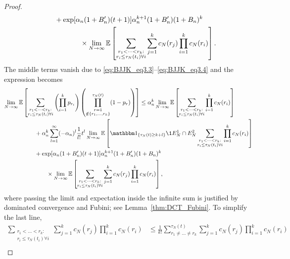 \begin{proof}
\begin{align}
    &\qquad+ \exp[ \alpha_n (1 + B_n^\prime) (t+1) ]
        \alpha_n^{k+1} (1 + B_n^\prime) (1 + B_n)^k \notag\\
    &\hspace{2cm}\times \lim_{N\to\infty} \mathbb{E}\left[ \sum_{\substack{r_1 <\dots< r_k 
        :\\ r_i \leq \tau_N(t_i) \forall i}}
        \sum_{j=1}^k c_N(r_j)
        \prod_{i=1}^k c_N(r_i) \right] . \label{eq:043}
\end{align}
The middle terms vanish due to \eqref{eq:BJJK_eq3.3}--\eqref{eq:BJJK_eq3.4} and the expression becomes
\begin{align}
\lim_{N\to\infty} \E &\left[ 
        \sum_{\substack{r_1 <\dots< r_k :\\ r_i \leq \tau_N(t_i) \forall i}}
        \left( \prod_{i=1}^k p_{r_i} \right)
        \left( \prod_{\substack{r=1 \\ \notin \{r_1,\dots,r_k\} }}^{\tau_N(t)} 
        (1-p_r) \right) \right]
\leq \alpha_n^k \lim_{N\to\infty} \E \left[
        \sum_{\substack{r_1 <\dots< r_k :\\ r_i \leq \tau_N(t_i) \forall i}}
        \prod_{i=1}^k c_N(r_i) \right] \notag\\
    &\qquad + \alpha_n^k
        \sum_{l=1}^{\infty} (-\alpha_n)^l \frac{1}{l!} t^l
        \lim_{N\to\infty} \E \left[ \I{\tau_N(t)\geq k+l} \1{E_N^1 \cap E_N^2}
        \sum_{\substack{r_1 <\dots< r_k :\\ r_i \leq \tau_N(t_i) \forall i}}
        \prod_{i=1}^k c_N(r_i) \right] \notag\\
    &\qquad+ \exp[ \alpha_n (1 + B_n^\prime) (t+1) ]
        \alpha_n^{k+1} (1 + B_n^\prime) (1 + B_n)^k \notag\\
    &\qquad\qquad\times \lim_{N\to\infty} \E \left[ 
        \sum_{\substack{r_1 <\dots< r_k :\\ r_i \leq \tau_N(t_i) \forall i}}
        \sum_{j=1}^k c_N(r_j)
        \prod_{i=1}^k c_N(r_i) \right] , \label{eq:040}
\end{align}
where passing the limit and expectation inside the infinite sum is justified by dominated convergence and Fubini; see Lemma~\ref{thm:DCT_Fubini}.
To simplify the last line,
\begin{align*}
\sum_{\substack{r_1 <\dots< r_k :\\ r_i \leq \tau_N(t_i) \forall i}}
        \sum_{j=1}^k c_N(r_j)
        \prod_{i=1}^k c_N(r_i)
&\leq \frac{1}{k!} \sum_{r_1 \neq \dots\neq r_k}^{\tau_N(t)}
        \sum_{j=1}^k c_N(r_j)
        \prod_{i=1}^k c_N(r_i) \\

\end{align*}
\end{proof}
